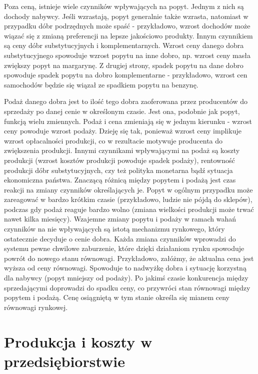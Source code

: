 \documentclass[12pt]{extarticle}
\begin{document}
Poza ceną, istnieje wiele czynników wpływających na popyt. Jednym z nich są dochody nabywcy. Jeśli wzrastają, popyt generalnie także wzrasta, natomiast w przypadku dóbr podrzędnych może spaść - przykładowo, wzrost dochodów może wiązać się z zmianą preferencji na lepsze jakościowo produkty. Innym czynnikiem są ceny dóbr substytucyjnych i komplementarnych. Wzrost ceny danego dobra substytucyjnego spowoduje wzrost popytu na inne dobro, np. wzrost ceny masła zwiększy popyt na margarynę. Z drugiej strony, spadek popytu na dane dobro spowoduje spadek popytu na dobro komplementarne - przykładowo, wzrost cen samochodów będzie się wiązał ze spadkiem popytu na benzynę.


Podaż danego dobra jest to ilość tego dobra zaoferowana przez producentów do sprzedaży po danej cenie w określonym czasie. Jest ona, podobnie jak popyt, funkcją wielu zmiennych. Podaż i cena zmieniają się w jednym kierunku - wzrost ceny powoduje wzrost podaży. Dzieję się tak, ponieważ wzrost ceny implikuje wzrost opłacalności produkcji, co w rezultacie motywuje producenta do zwiększenia produkcji. Innymi czynnikami wpływającymi na podaż są koszty produkcji (wzrost kosztów produkcji powoduje spadek podaży), rentowność produkcji dóbr substytucyjnych, czy też polityka monetarna bądź sytuacja ekonomiczna państwa. Znaczącą różnicą między popytem i podażą jest czas reakcji na zmiany czynników określających je. Popyt w ogólnym przypadku może zareagować w bardzo krótkim czasie (przykładowo, ludzie nie pójdą do sklepów), podczas gdy podaż reaguje bardzo wolno (zmiana wielkości produkcji może trwać nawet kilka miesięcy).
Wzajemne zmiany popytu i podaży w ramach wahań czynników na nie wpływających są istotą mechanizmu rynkowego, który ostatecznie decyduje o cenie dobra. Każda zmiana czynników wprowadzi do systemu pewne chwilowe zaburzenie, które dzięki działaniom rynku spowoduje powrót do nowego stanu równowagi. Przykładowo, załóżmy, że aktualna cena jest wyższa od ceny równowagi. Spowoduje to nadwyżkę dobra i sytuację korzystną dla nabywcy (popyt mniejszy od podaży). Po jakimś czasie konkurencja między sprzedającymi doprowadzi do spadku ceny, co przywróci stan równowagi między popytem i podażą. Cenę osiągniętą w tym stanie określa się mianem ceny równowagi rynkowej.





\section{Produkcja i koszty w przedsiębiorstwie}
\end{document}

